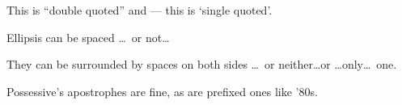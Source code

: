 This is ``double quoted'' and --- this is `single quoted'.

Ellipsis can be spaced \dots\ or not\dots

They can be surrounded by spaces on both sides \dots\ or neither\dots or \dots only\dots\ one.

Possessive's apostrophes are fine, as are prefixed ones like '80s.

